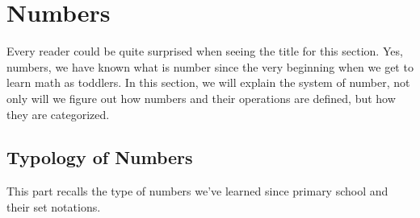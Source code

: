 \documentclass[
	12pt, %
	fleqn, %
	a4paper, %
]{LegrandOrangeBook}
\begin{document}

\section{Numbers}
Every reader could be quite surprised when seeing the title for this section. Yes, numbers, we have known what is number since the very beginning when we get to learn math as toddlers. In this section, we will explain the system of number, not only will we figure out how numbers and their operations are defined, but how they are categorized.
\subsection{Typology of Numbers}
This part recalls the type of numbers we've learned since primary school and their set notations.
\end{document}
